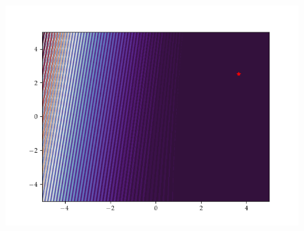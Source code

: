 \begin{figure}[h]
\begin{minipage}[b]{0.32\textwidth}
      \includegraphics[trim=2.5cm 1.3cm 2.5cm 1.3cm,clip,width=\textwidth]{Figures/coco/f18.png}
    \end{minipage}
    


\end{figure}
